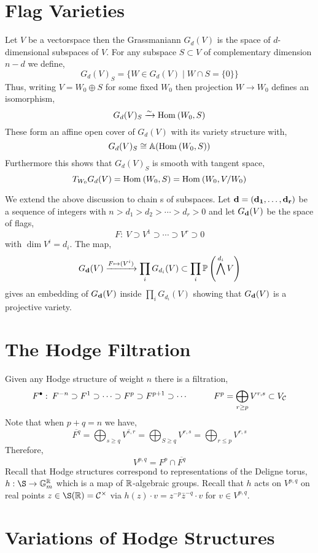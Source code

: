 \documentclass[12pt]{article}
\begin{document}
\newcommand{\CH}{\mathrm{CH}}
\newcommand{\GV}{\mathbf{Vect}_F^\bullet}
\newcommand{\et}{\text{\'{e}t}}
\newcommand{\etale}{\'{e}tale\xspace}
\newcommand{\dR}{\mathrm{dR}}


\section{Flag Varieties}

\begin{definition}
Let $V$ be a vectorspace then the Grassmaniann $G_d(V)$ is the space of $d$-dimensional subspaces of $V$. For any subspace $S \subset V$ of complementary dimension $n - d$ we define,
\[ G_d(V)_S = \{ W \in G_d(V) \mid W \cap S = \{ 0 \} \} \]
Thus, writing $V =  W_0 \oplus S$ for some fixed $W_0$ then projection $W \to W_0$ defines an isomorphism,
\[ G_d(V)_S \xrightarrow{\sim} \Hom{}{W_0}{S} \]
These form an affine open cover of $G_d(V)$ with its variety structure with, 
\[ G_d(V)_S \cong \A(\Hom{}{W_0}{S}) \]
Furthermore this shows that $G_d(V)_S$ is smooth with tangent space,
\[ T_{W_0} G_d(V) = \Hom{}{W_0}{S} = \Hom{}{W_0}{V/W_0} \] 
\end{definition}

\begin{definition}
We extend the above discussion to chain s of subspaces. Let $\bf{d} = (d_1, \dots, d_r)$ be a sequence of integers with $n > d_1 > d_2 > \cdots > d_r > 0$ and let $G_{\bf{d}}(V)$ be the space of flags,
\[ F : \: V \supset V^1 \supset \cdots \supset V^r \supset 0 \]
with $\dim{V^i} = d_i$. The map,
\[ G_{\bf{d}}(V) \xrightarrow{F \mapsto (V^i)} \prod_{i} G_{d_i}(V) \subset \prod_i \P\left( \bigwedge^{d_i} V \right) \]
gives an embedding of $G_{\bf{d}}(V)$ inside $\prod_i G_{d_i}(V)$ showing that $G_{\bf{d}}(V)$ is a projective variety.
\end{definition}

\section{The Hodge Filtration}

Given any Hodge structure of weight $n$ there is a filtration,
\[ F^\bullet : \: F^{-n} \supset F^1 \supset \cdots \supset F^p \supset F^{p+1} \supset \cdots \quad \quad \quad F^p = \bigoplus_{r \ge p} V^{r,s} \subset V_\C \]
Note that when $p + q = n$ we have,
\[ \overline{F^q} = \bigoplus_{s \ge q} \overline{V^{s,r}} = \bigoplus_{S \ge q} V^{r,s} = \bigoplus_{r \le p} V^{r,s} \]
Therefore,
\[ V^{p,q} = F^p \cap \overline{F^q} \]
Recall that Hodge structures correspond to representations of the Deligne torus, $h : \S \to \Gm^\R$ which is a map of $\R$-algebraic groups. Recall that $h$ acts on $V^{p,q}$ on real points $z \in \S(\R) = \C^\times$ via $h(z) \cdot v = z^{-p} \bar{z}^{-q} \cdot v$ for $v \in V^{p,q}$. 

\section{Variations of Hodge Structures}
\end{document}

